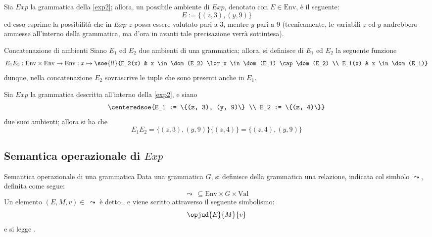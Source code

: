 \documentclass[a4paper, 12pt]{report}
\begin{document}
    \begin{example}
        Sia $Exp$ la grammatica della \cref{exp2}; allora, un possibile ambiente di $Exp$, denotato con $E \in \mathrm{Env}$, è il seguente: $$E := \{(z,3), (y, 9) \}$$ ed esso esprime la possibilità che in $Exp$ $z$ possa essere valutato pari a 3, mentre $y$ pari a 9 (tecnicamente, le variabili $z$ ed $y$ andrebbero ammesse all'interno della grammatica, ma d'ora in avanti tale precisazione verrà sottintesa).
    \end{example}

    \begin{frameddefn}{Concatenazione di ambienti}
        Siano $E_1$ ed $E_2$ due ambienti di una grammatica; allora, si definisce  di $E_1$ ed $E_2$ la seguente funzione $$E_1E_2: \mathrm{Env} \times \mathrm{Env} \to \mathrm{Env} : x \mapsto \soe{ll}{E_2(x) & x \in \dom(E_2) \lor x \in \dom(E_1) \cap \dom(E_2) \\ E_1(x) & x \in \dom(E_1)}$$ dunque, nella concatenazione $E_2$ sovrascrive le tuple che sono presenti anche in $E_1$.
    \end{frameddefn}

    \begin{example}
        Sia $Exp$ la grammatica descritta all'interno della \cref{exp2}, e siano $$\centeredsoe{E_1 := \{(z, 3), (y, 9)\} \\ E_2 := \{(z, 4)\}}$$ due suoi ambienti; allora si ha che $$E_1E_2 = \{(z, 3), (y, 9)\}\{(z, 4)\} = \{(z, 4), (y, 9)\}$$
    \end{example}

    \subsection{Semantica operazionale di $Exp$}

    \begin{frameddefn}[label={sem opexp}]{Semantica operazionale di una grammatica}
        Data una grammatica $G$, si definisce  della grammatica una relazione, indicata col simbolo $\leadsto$, definita come segue: $$\leadsto \ \subseteq \mathrm{Env} \times G \times \mathrm{Val}$$
        Un elemento $(E, M, v) \in \ \leadsto$ è detto , e viene scritto attraverso il seguente simbolismo: $$\opjud{E}{M}{v}$$ e si legge .
    \end{frameddefn}
\end{document}
